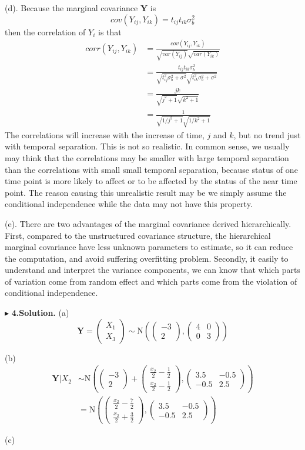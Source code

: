 \documentclass[letterpaper, 12pt]{article}
\newcommand{\ba}{$$\begin{aligned}}
\newcommand{\ea}{\end{aligned}$$}
\newcommand{\lma}{\left(\begin{matrix}}
\newcommand{\rma}{\end{matrix}\right)}
\begin{document}
(d). Because the marginal covariance $\bm{Y}$ is
$$
cov(Y_{ij},Y_{ik})=t_{ij}t_{ik}\sigma_b^2
$$
then the correlation of $Y_i$ is that 
\ba
corr(Y_{ij},Y_{ik})&=\frac{cov(Y_{ij},Y_{ik})}{\sqrt{var(Y_{ij})}\sqrt{var(Y_{ik})}}\\
&=\frac{t_{ij}t_{ik}\sigma_b^2}{\sqrt{t_{ij}^2\sigma_b^2+\sigma^2}\sqrt{t_{ik}^2\sigma_b^2+\sigma^2}}\\
&=\frac{jk}{\sqrt{j^2+1}\sqrt{k^2+1}}\\
&=\frac{1}{\sqrt{1/j^2+1}\sqrt{1/k^2+1}}
\ea
The correlations will increase with the increase of time, $j$ and $k$, but no trend just with temporal separation. This is not so realistic. In common sense, we usually may think that the correlations may be smaller with large temporal separation than the correlations with small small temporal separation, because status of one time point is more likely to affect or to be affected by the status of the near time point. The reason causing this unrealistic result may be we simply assume the conditional independence while the data may not have this property.

(e). There are two advantages of the marginal covariance derived hierarchically. First, compared to the unstructured covariance structure, the hierarchical marginal covariance have less unknown parameters to estimate, so it can reduce the computation, and avoid suffering overfitting problem. Secondly, it easily to understand and interpret the variance components, we can know that which parts of variation come from random effect and which parts come from the violation of conditional independence.




$\blacktriangleright$ \textbf{4.\quad Solution.} 
(a) 
$$
\bm{Y}=\lma X_1\\X_3\rma\sim \text{N}\left(\lma -3 \\2\rma,\lma 4&0\\0&3\rma\right)
$$

(b)
\ba
\bm{Y}|X_2&\sim\text{N}\left(\lma -3\\2\rma+\lma \frac{x_2}{2}-\frac12\\\frac{x_2}2-\frac12\rma,\lma 3.5 &-0.5\\-0.5 &2.5\rma\right)\\
&=\text{N}\left(\lma \frac{x_2}{2}-\frac72\\\frac{x_2}2+\frac32\rma,\lma 3.5 &-0.5\\-0.5 &2.5\rma\right)
\ea


(c)
\end{document}
